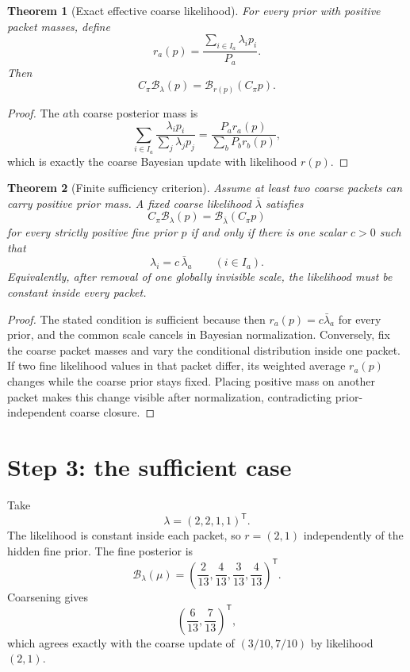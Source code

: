 \documentclass[11pt,oneside]{book}
\newtheorem{theorem}{Theorem}[chapter]
\theoremstyle{definition}
\theoremstyle{remark}
\newcommand{\Bcal}{\mathcal B}
\begin{document}
\begin{theorem}[Exact effective coarse likelihood]\label{thm:effective-likelihood}
For every prior with positive packet masses, define
\[
r_a(p)=\frac{\sum_{i\in I_a}\lambda_ip_i}{P_a}.
\]
Then
\[
\boxed{C_\pi\Bcal_\lambda(p)=\Bcal_{r(p)}(C_\pi p).}
\]
\end{theorem}

\begin{proof}
The $a$th coarse posterior mass is
\[
\sum_{i\in I_a}\frac{\lambda_ip_i}{\sum_j\lambda_jp_j}
=\frac{P_ar_a(p)}{\sum_bP_br_b(p)},
\]
which is exactly the coarse Bayesian update with likelihood $r(p)$.
\end{proof}

\begin{theorem}[Finite sufficiency criterion]
Assume at least two coarse packets can carry positive prior mass.  A fixed coarse likelihood $\bar\lambda$ satisfies
\[
C_\pi\Bcal_\lambda(p)=\Bcal_{\bar\lambda}(C_\pi p)
\]
for every strictly positive fine prior $p$ if and only if there is one scalar $c>0$ such that
\[
\lambda_i=c\,\bar\lambda_a
\qquad(i\in I_a).
\]
Equivalently, after removal of one globally invisible scale, the likelihood must be constant inside every packet.
\end{theorem}

\begin{proof}
The stated condition is sufficient because then $r_a(p)=c\bar\lambda_a$ for every prior, and the common scale cancels in Bayesian normalization.  Conversely, fix the coarse packet masses and vary the conditional distribution inside one packet.  If two fine likelihood values in that packet differ, its weighted average $r_a(p)$ changes while the coarse prior stays fixed.  Placing positive mass on another packet makes this change visible after normalization, contradicting prior-independent coarse closure.
\end{proof}

\section{Step 3: the sufficient case}
Take
\[
\lambda=(2,2,1,1)^{\mathsf T}.
\]
The likelihood is constant inside each packet, so $r=(2,1)$ independently of the hidden fine prior. The fine posterior is
\[
\Bcal_\lambda(\mu)
=\left(\frac2{13},\frac4{13},\frac3{13},\frac4{13}\right)^{\mathsf T}.
\]
Coarsening gives
\[
\left(\frac6{13},\frac7{13}\right)^{\mathsf T},
\]
which agrees exactly with the coarse update of $(3/10,7/10)$ by likelihood $(2,1)$.
\end{document}
